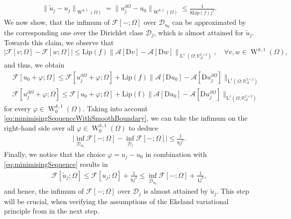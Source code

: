 \documentclass[a4paper,10pt,reqno,oneside]{amsart}
\numberwithin{equation}{section}
\newcommand{\R}{\mathbb R}
\newcommand{\A}{\mathscr{A}}
\newcommand{\Aop}{\mathbb{A}}
\newcommand{\lebe}{\operatorname{L}}
\newcommand{\sobo}{\operatorname{W}}
\newcommand{\D}{\mathrm{D}}
\newcommand{\del}{\partial}
\newcommand{\F}{\mathscr{F}}
\renewcommand{\L}{\mathrm{L}}
\begin{document}
\begin{align}\label{eq:minimisingSequenceWithSmoothBoundary}
	\|\tilde{u}_j - u_j\|_{\sobo^{\Aop,1}(\Omega)} = \|u_j^{\del\Omega} - u_0 \|_{\sobo^{\Aop,1}(\Omega)}\leq \frac{1}{8\mathrm{Lip}(f) j^2}. 
\end{align} 
We now show, that the infimum of $\F[-;\Omega]$ over $\mathscr{D}_{u_0}$ can be approximated by the corresponding one over the Dirichlet class $\mathscr{D}_j$, which is almost attained for $\tilde{u}_j$. Towards this claim, we observe that 
\begin{equation*}
	\big \vert \F[v;\Omega] - \F[w;\Omega]\big\vert \leq \mathrm{Lip}(f) \|\A[\D v]- \A[\D w] \|_{\lebe^1(\Omega;\R^{2\times2}_\A)},\quad \forall  v,w \in \sobo^{\Aop,1}(\Omega),
\end{equation*}
and thus, we obtain 
\begin{align*}
	&\F[u_0+\varphi; \Omega] \leq \F[u_j^{\del\Omega}+\varphi; \Omega] + \mathrm{Lip}(f) \|\A[\D u_0] - \A [\D u_j^{\del\Omega}]\|_{\L^1(\Omega; \R^{2\times 2}_\A)}\\
	&\F[u_j^{\del\Omega}+\varphi; \Omega ]\leq \F[u_0+\varphi; \Omega] + \mathrm{Lip(f)} \|\A[\D u_0] - \A[\D u_j^{\del\Omega}]\|_{\L^1(\Omega;\R^{2\times 2}_\A)}
\end{align*}
for every $\varphi\in\sobo^{\Aop,1}_0(\Omega)$. Taking into account \eqref{eq:minimisingSequenceWithSmoothBoundary}, we can take the infimum on the right-hand side over all $\varphi\in\sobo^{\Aop,1}_0(\Omega)$ to deduce
\begin{align}\label{eq:InfimaApproximation}
	\bigg\vert \inf_{\mathscr{D}_{u_0}}\F[-;\Omega] - \inf_{\mathscr{D}_{j}} \F[-;\Omega]\bigg\vert\leq \frac{1}{8j^2}.
\end{align}
Finally, we notice that the choice $\varphi = u_j-u_0$ in combination with \eqref{eq:minimisingSequence} results in 
\begin{align}\label{eq:AlmostAttainment}
	\F[\tilde{u}_j;\Omega] \leq \F[u_j; \Omega] + \frac{1}{8j^2} \leq \inf_{\mathscr{D}_{u_0}}\F[-;\Omega]+ \frac{1}{4j^2},
\end{align}
and hence, the infimum of $\F[-;\Omega]$ over $\mathscr{D}_j$ is almost attained by $\tilde{u}_j$. This step will be crucial, when verifying the assumptions of the Ekeland variational principle from  in the next step. \\
\end{document}
